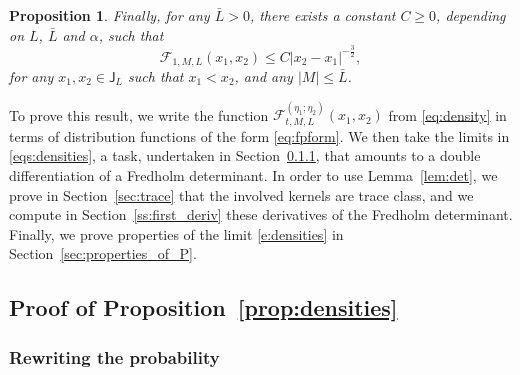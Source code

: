 \documentclass[oneside,final,11pt]{amsart}
\newtheorem{prop}[thm]{Proposition}
\theoremstyle{definition}
\newcommand{\fh}{\mathfrak{h}}
\newcommand{\bJ}{\mathsf{J}}
\newcommand{\R}{\mathbb{R}}
\newcommand{\dens}{\CF}
\newcommand{\1}[1]{\mathbf{1}_{#1}}
\newcommand{\kmtext}[1]{{\color{red}[KM:#1]}}
\newcommand{\CF}{\mathcal{F}}
\numberwithin{equation}{section}
\begin{document}
\begin{prop}
Finally, for any $\bar L > 0$, there exists a constant $C \geq 0$, depending on $L$, $\bar L$ and $\alpha$, such that %
\begin{equation}\label{eq:P_bound}
\dens_{1, M, L}(x_1, x_2) \leq C |x_2 - x_1|^{-\frac{3}{2}},
\end{equation}
for any  $x_1, x_2 \in \bJ_L$ such that $x_1 < x_2$, and any $|M| \leq \bar L$.
\end{prop}

To prove this result, we write the function $\dens_{t, M, L}^{(\eta_1; \eta_2)}(x_1, x_2)$ from \eqref{eq:density} in terms of distribution functions of the form \eqref{eq:fpform}. We then take the limits in \eqref{eqs:densities}, a task, undertaken in  Section~\ref{sec:KPZ_application}, that amounts to a double differentiation of a Fredholm determinant. In order to use Lemma~\ref{lem:det},  we prove in Section~\ref{sec:trace} that the involved kernels are trace class, and we compute  in Section~\ref{ss:first_deriv} these derivatives of the Fredholm determinant. Finally, we prove properties of the limit \eqref{e:densities} in Section~\ref{sec:properties_of_P}.

\subsection{Proof of Proposition~\ref{prop:densities}}

\subsubsection{Rewriting the probability}
\label{sec:KPZ_application}
\end{document}
